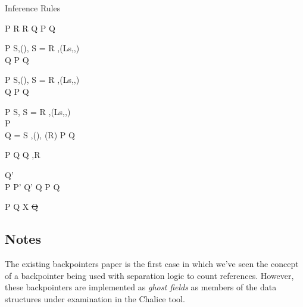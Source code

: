 \documentclass[a4paper]{article}
\begin{document}
\begin{display}{Inference Rules}
    {}
    {}
  \vg

    {}
    {}
  \vg

    {}
    {}
  \vg

    {}
    {}
  \vg

    {\tr P {} R \quad \tr R {} Q}
    {\tr P {} Q}
  \vg

    {\tr P {}{S\sep \istrue()\sep\rv\doteq{}} \qquad
     S = R \sep \getValue(Ls,,)\\
      Q}
    {\tr P {} Q}
  \vg

    {\tr P {}{S\sep \isfalse()\sep\rv\doteq{}} \qquad
     S = R \sep \getValue(Ls,,)\\
      Q}
    {\tr P {} Q}
  \vg

    {\tr P {} {S\sep\rv\doteq{}} \qquad
    S = R \sep \getValue(Ls,,)\\
      {} P\\
     Q = S \sep \isfalse()\sep\rv\doteq\und\qquad
     \rv\not\in \fv(R)}
    {\tr P {} Q}
  \vg

    {\tr P {} Q}
    { {} {Q \sep R}}

    { {} {Q'} \\
     P \impl P' \quad Q' \impl Q}
    {\tr P {} Q}
  \vg

    {\tr P {} Q}
    { {} {\exists X \st Q}}

    { \quad {}}
    {}

\end{display}

\subsection{Notes}
The existing backpointers paper\cite{KassiosKritikos12} is the first case in
which we've seen the concept of a backpointer being used with separation logic
to count references. However, these backpointers are implemented as \emph{ghost
fields} as members of the data structures under examination in the Chalice
tool.
\end{document}
